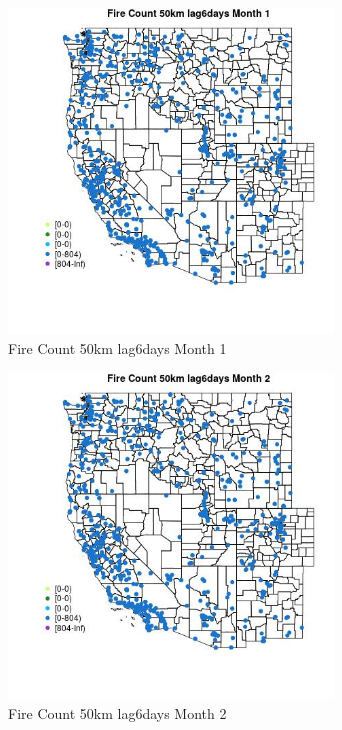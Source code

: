 \begin{figure} 
\centering  
\includegraphics[width=0.77\textwidth]{Code_Outputs/Report_ML_input_PM25_Step4_part_f_de_duplicated_aveswNAs_MapObsMo1Fire_Count_50km_lag6days.jpg} 
\caption{\label{fig:Report_ML_input_PM25_Step4_part_f_de_duplicated_aveswNAsMapObsMo1Fire_Count_50km_lag6days}Fire Count 50km lag6days Month 1} 
\end{figure} 
 

\begin{figure} 
\centering  
\includegraphics[width=0.77\textwidth]{Code_Outputs/Report_ML_input_PM25_Step4_part_f_de_duplicated_aveswNAs_MapObsMo2Fire_Count_50km_lag6days.jpg} 
\caption{\label{fig:Report_ML_input_PM25_Step4_part_f_de_duplicated_aveswNAsMapObsMo2Fire_Count_50km_lag6days}Fire Count 50km lag6days Month 2} 
\end{figure} 
 

